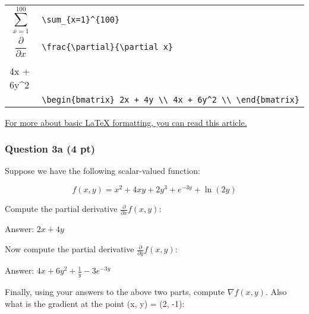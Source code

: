 \documentclass[11pt]{article}
\begin{document}
\begin{longtable}[]{@{}ll@{}}
\begin{minipage}[t]{0.07\columnwidth}
\[\sum_{x=1}^{100}\]\strut
\end{minipage} & \begin{minipage}[t]{0.07\columnwidth}\raggedright\strut
\texttt{\textbackslash{}sum\_\{x=1\}\^{}\{100\}}\strut
\end{minipage}\tabularnewline
\begin{minipage}[t]{0.07\columnwidth}\raggedright\strut
\[\frac{\partial}{\partial x} \]\strut
\end{minipage} & \begin{minipage}[t]{0.07\columnwidth}\raggedright\strut
\texttt{\textbackslash{}frac\{\textbackslash{}partial\}\{\textbackslash{}partial\ x\}}\strut
\end{minipage}\tabularnewline
\begin{minipage}[t]{0.07\columnwidth}\raggedright\strut
\[\begin{bmatrix} 2x + 4y \\ 4x + 6y^2 \\ \end{bmatrix}\]\strut
\end{minipage} & \begin{minipage}[t]{0.07\columnwidth}\raggedright\strut
\texttt{\textbackslash{}begin\{bmatrix\}\ 2x\ +\ 4y\ \textbackslash{}\textbackslash{}\ 4x\ +\ 6y\^{}2\ \textbackslash{}\textbackslash{}\ \textbackslash{}end\{bmatrix\}}\strut
\end{minipage}\tabularnewline
\bottomrule
\end{longtable}

\href{https://www.sharelatex.com/learn/Mathematical_expressions}{For
more about basic LaTeX formatting, you can read this article.}

    \subsubsection{Question 3a (4 pt)}\label{question-3a-4-pt}

Suppose we have the following scalar-valued function:

\[ f(x, y) = x^2 + 4xy + 2y^3 + e^{-3y} + \ln(2y) \]

Compute the partial derivative \(\frac{\partial}{\partial x} f(x,y)\):

    Answer: \(2x + 4y\)

    Now compute the partial derivative
\(\frac{\partial}{\partial y} f(x,y)\):

    Answer: \(4x + 6y^2 + \frac{1}{y} - 3e^{-3y}\)

    Finally, using your answers to the above two parts, compute
\(\nabla f(x, y)\). Also what is the gradient at the point (x, y) = (2,
-1):
\end{document}
